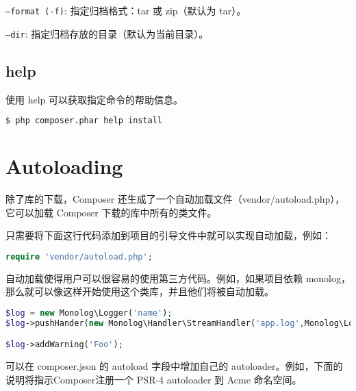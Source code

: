 \begin{compactitem}
\item \texttt{--format (-f)}: 指定归档格式：tar 或 zip（默认为 tar）。
\item \texttt{--dir}: 指定归档存放的目录（默认为当前目录）。
\end{compactitem}



\section{help}

使用 help 可以获取指定命令的帮助信息。

\begin{lstlisting}[language=bash]
$ php composer.phar help install
\end{lstlisting}




















\chapter{Autoloading}

除了库的下载，Composer 还生成了一个自动加载文件（vendor/autoload.php），它可以加载 Composer 下载的库中所有的类文件。

只需要将下面这行代码添加到项目的引导文件中就可以实现自动加载，例如：

\begin{lstlisting}[language=PHP]
require 'vendor/autoload.php';
\end{lstlisting}


自动加载使得用户可以很容易的使用第三方代码。例如，如果项目依赖 monolog，那么就可以像这样开始使用这个类库，并且他们将被自动加载。

\begin{lstlisting}[language=PHP]
$log = new Monolog\Logger('name');
$log->pushHander(new Monolog\Handler\StreamHandler('app.log',Monolog\Logger::WARNING));

$log->addWarning('Foo');
\end{lstlisting}

可以在 composer.json 的 autoload 字段中增加自己的 autoloader。例如，下面的说明将指示Composer注册一个 PSR-4 autoloader 到 Acme 命名空间。

